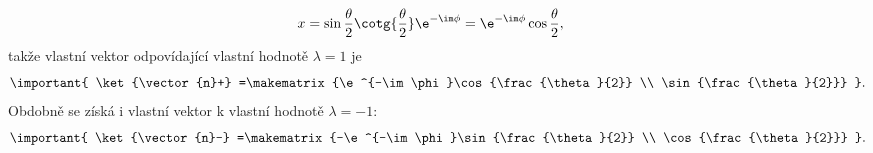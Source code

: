 \begin{solution}
\begin{enumerate}
\begin{subequations}
\begin{align}
                x&=\sin{\frac{\theta}{2}}\cotg{\frac{\theta}{2}}\e^{-\im\phi}
                    =\e^{-\im\phi}\cos{\frac{\theta}{2}},
            \end{align}
        \end{subequations}
		takže vlastní vektor odpovídající vlastní hodnotě $\lambda=1$ je
		\begin{equation}
    		\important{
	    		\ket{\vector{n}+}
		    		=\makematrix{\e^{-\im\phi}\cos{\frac{\theta}{2}} \\ \sin{\frac{\theta}{2}}}
		    }.
		\end{equation}
		Obdobně se získá i vlastní vektor k vlastní hodnotě $\lambda=-1$:
		\begin{equation}
    		\important{
                \ket{\vector{n}-}
                    =\makematrix{-\e^{-\im\phi}\sin{\frac{\theta}{2}} \\ \cos{\frac{\theta}{2}}}
		    }.
        \end{equation}
        		

\end{enumerate}
\end{solution}
